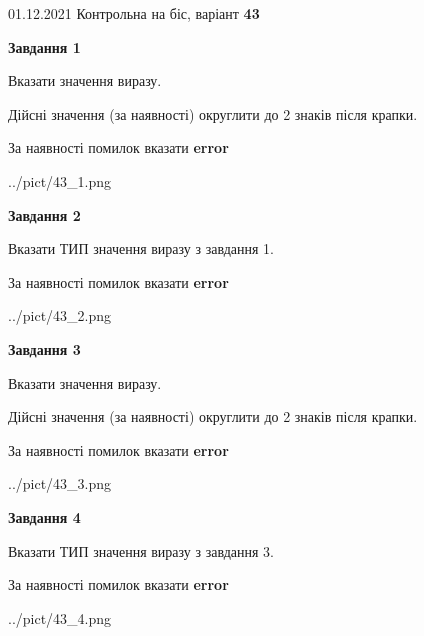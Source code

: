\documentclass[11pt, ukrainian]{article}
\begin{document}
{01.12.2021 Контрольна на біс, варіант  \No \textbf { 43 }\par}
{
\begin {large}
{\begin {center}\textbf{Завдання 1}\end {center}}\par
Вказати значення виразу. \par
Дійсні значення (за наявності) округлити до 2 знаків після крапки. \par
За наявності помилок вказати \textbf{error}

\begin{center}
	{../pict/43_1.png}
\end{center}
\newpage

{\begin {center}\textbf{Завдання 2}\end {center}}\par
Вказати ТИП значення виразу з завдання 1. \par
За наявності помилок вказати \textbf{error}

\begin{center}
	{../pict/43_2.png}
\end{center}
\newpage

{\begin {center}\textbf{Завдання 3}\end {center}}\par
Вказати значення виразу. \par
Дійсні значення (за наявності) округлити до 2 знаків після крапки. \par
За наявності помилок вказати \textbf{error}

\begin{center}
	{../pict/43_3.png}
\end{center}
\newpage

{\begin {center}\textbf{Завдання 4}\end {center}}\par
Вказати ТИП значення виразу з завдання 3. \par
За наявності помилок вказати \textbf{error}

\begin{center}
	{../pict/43_4.png}
\end{center}
\newpage


\end{large}}
\end{document}
